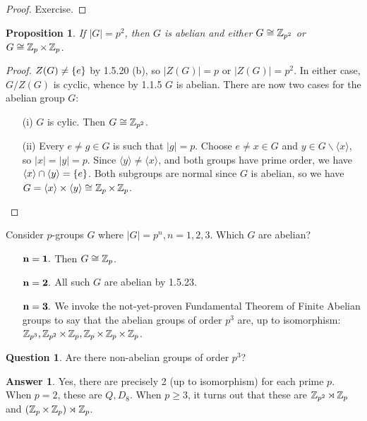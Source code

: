 \documentclass[11pt]{book}
\newcounter{counter}
\newtheorem{proposition}[counter]{Proposition}   \newtheorem{problem}[counter]{Problem}   \newtheorem*{proposition*}{Proposition}   \newtheorem*{lemma*}{Lemma}
\theoremstyle{definition}   \newtheorem{defn}[counter]{Definition} %
\newtheorem*{question}{Question}   \newtheorem*{answer}{Answer}   \newtheorem{modification}[counter]{Modification}   \newtheorem{numitem}[counter]{}
\newcommand{\bs}{\backslash}   \newcommand{\A}{\mathcal{A}}   \newcommand{\sy}{\textnormal{Syl}}   \newcommand{\size}[1]{\left| #1 \right|}
\newcommand{\gen}[1]{\langle #1 \rangle}   \newcommand{\stab}[2]{\tn{Stab}_{#1}(#2)}   \newcommand{\fix}[2]{\tn{Fix}_{#1}(#2)}
\newcommand{\vs}{\vspace{8pt}}
\numberwithin{counter}{chapter}
\begin{document}
\begin{proof}
Exercise.
\end{proof}

\vs

\begin{proposition}
If $|G| = p^2$, then $G$ is abelian and either $G \cong \operatorname{\mathbb{Z}}_{p^2}$ or $G \cong \operatorname{\mathbb{Z}}_p \times \operatorname{\mathbb{Z}}_p$.
\end{proposition}

\begin{proof}
$Z(G) \ne \{e\}$ by 1.5.20 (b), so $|Z(G)| = p$ or $|Z(G)| = p^2$. In either case, $G/Z(G)$ is cyclic, whence by 1.1.5 $G$ is abelian. There are now two cases for the abelian group $G$:
	\begin{enumerate}
	\item[(i)] $G$ is cylic. Then $G \cong \operatorname{\mathbb{Z}}_{p^2}$.
	\item[(ii)] Every $e \ne g \in G$ is such that $|g| = p$. Choose $e \ne x \in G$ and $y \in G\bs \gen{x}$, so $|x| = |y| = p$. Since $\gen{y} \ne \gen{x}$, and both groups have prime order, we have $\gen{x} \cap \gen{y} = \triv$. Both subgroups are normal since $G$ is abelian, so we have $G = \gen{x} \times \gen{y} \cong \z_p \times \z_p$.
	\end{enumerate}
\end{proof}

\vs

\begin{remark*}
Consider $p$-groups $G$ where $|G| = p^n, n=1,2,3$. Which $G$ are abelian?
\begin{enumerate}
\item[$\mathbf{n=1.}$ ] Then $G \cong \operatorname{\mathbb{Z}}_p$.
\item[$\mathbf{n=2.}$ ] All such $G$ are abelian by 1.5.23.
\item[$\mathbf{n=3.}$ ] We invoke the not-yet-proven Fundamental Theorem of Finite Abelian groups to say that the abelian groups of order $p^3$ are, up to isomorphism: $\operatorname{\mathbb{Z}}_{p^3}, \operatorname{\mathbb{Z}}_{p^2} \times \operatorname{\mathbb{Z}}_p, \operatorname{\mathbb{Z}}_p\times \operatorname{\mathbb{Z}}_p \times \operatorname{\mathbb{Z}}_p$.
\end{enumerate}
\end{remark*}

\vs

\begin{question}
Are there non-abelian groups of order $p^3$?
\end{question}

\begin{answer}
Yes, there are precisely 2 (up to isomorphism) for each prime $p$. When $p=2$, these are $Q, D_8$. When $p\geq 3$, it turns out that these are $\operatorname{\mathbb{Z}}_{p^2} \rtimes \operatorname{\mathbb{Z}}_p$ and $(\operatorname{\mathbb{Z}}_p \times \operatorname{\mathbb{Z}}_p) \rtimes \operatorname{\mathbb{Z}}_p$.
\end{answer}
\end{document}
